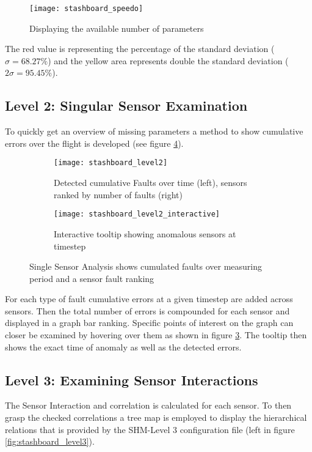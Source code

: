 \begin{figure}[!h]
    \centering
    \texttt{[image: stashboard\_speedo]}
    \caption{Displaying the available number of parameters}
    \label{fig:stashboard_speedo}
\end{figure}
The red value is representing the percentage of the standard deviation ($\sigma=68.27\%$) and the yellow area represents double the standard deviation ($2\sigma=95.45\%$).

\subsection{Level 2: Singular Sensor Examination}
To quickly get an overview of missing parameters a method to show cumulative errors over the flight is developed (see figure \ref{fig:stashboard_level2}).
\begin{figure}[!h]
    \centering
    \begin{subfigure}[b]{1\textwidth}
        \centering
        \texttt{[image: stashboard\_level2]}
        \caption{Detected cumulative Faults over time (left), sensors ranked by number of faults (right)}
        \label{fig:stashboard_level2_clean}
    \end{subfigure}
    \begin{subfigure}[b]{1\textwidth}
        \centering
        \texttt{[image: stashboard\_level2\_interactive]}
        \caption{Interactive tooltip showing anomalous sensors at timestep}
        \label{fig:stashboard_level2_interactive}
    \end{subfigure}
    \caption{Single Sensor Analysis shows cumulated faults over measuring period and a sensor fault ranking}
    \label{fig:stashboard_level2}
\end{figure}

For each type of fault cumulative errors at a given timestep are added across sensors. Then the total number of errors is compounded for each sensor and displayed in a graph bar ranking.
Specific points of interest on the graph can closer be examined by hovering over them as shown in figure \ref{fig:stashboard_level2_interactive}. The tooltip then shows the exact time of anomaly as well as the detected errors.


\subsection{Level 3: Examining Sensor Interactions}
The Sensor Interaction and correlation is calculated for each sensor. To then grasp the checked correlations a tree map is employed to display the hierarchical relations that is provided by the SHM-Level 3 configuration file (left in figure \ref{fig:stashboard_level3}).


